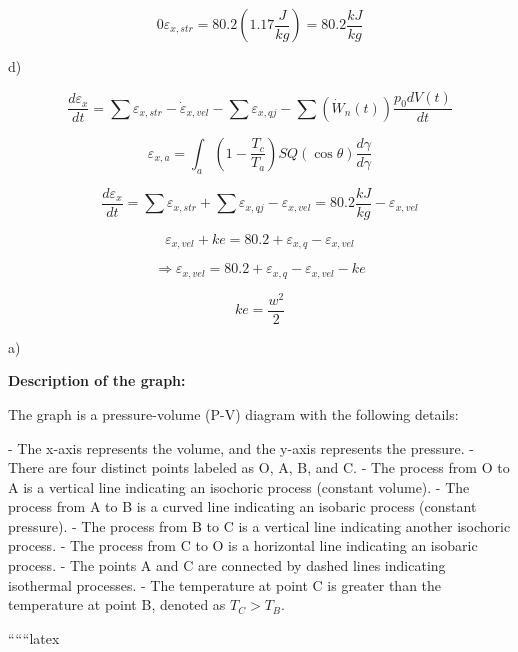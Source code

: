 \[
0 \varepsilon_{x,str} = 80.2 (1.17 \frac{J}{kg}) = 80.2 \frac{kJ}{kg}
\]

d)

\[
\frac{d \varepsilon_x}{dt} = \sum \varepsilon_{x,str} - \dot{\varepsilon}_{x,vel} - \sum \varepsilon_{x,qj} - \sum \left( \dot{W}_n (t) \right) \frac{p_0 dV(t)}{dt}
\]

\[
\varepsilon_{x,a} = \int_a (1 - \frac{T_c}{T_a}) SQ \left( \cos \theta \right) \frac{d \gamma}{d \gamma}
\]

\[
\frac{d \varepsilon_x}{dt} = \sum \varepsilon_{x,str} + \sum \varepsilon_{x,qj} - \varepsilon_{x,vel} = 80.2 \frac{kJ}{kg} - \varepsilon_{x,vel}
\]

\[
\varepsilon_{x,vel} + ke = 80.2 + \varepsilon_{x,q} - \varepsilon_{x,vel}
\]

\[
\Rightarrow \varepsilon_{x,vel} = 80.2 + \varepsilon_{x,q} - \varepsilon_{x,vel} - ke
\]

\[
ke = \frac{w^2}{2}
\]

a)

\textbf{Description of the graph:}

The graph is a pressure-volume (P-V) diagram with the following details:

- The x-axis represents the volume, and the y-axis represents the pressure.
- There are four distinct points labeled as O, A, B, and C.
- The process from O to A is a vertical line indicating an isochoric process (constant volume).
- The process from A to B is a curved line indicating an isobaric process (constant pressure).
- The process from B to C is a vertical line indicating another isochoric process.
- The process from C to O is a horizontal line indicating an isobaric process.
- The points A and C are connected by dashed lines indicating isothermal processes.
- The temperature at point C is greater than the temperature at point B, denoted as \( T_C > T_B \).

``````latex


